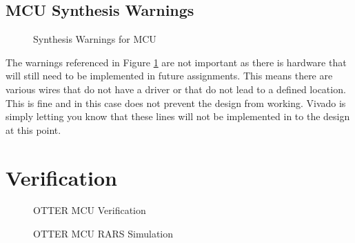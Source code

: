 \documentclass[
    a4paper, %
	12pt, %
    ]{CSSullivanBusinessReport}
\begin{document}
\begin{fullwidth}
\subsection{MCU Synthesis Warnings} %
\begin{figure}[H]
    \captionsetup{style=widetable}
    \caption{Synthesis Warnings for MCU}
    \label{fig:MCUWarnings}
\end{figure}

The warnings referenced in Figure \ref{fig:MCUWarnings} are not important as there is hardware that will still need to be implemented in future assignments. This means there are various wires that do not have a driver or that do not lead to a defined location. This is fine and in this case does not prevent the design from working. Vivado is simply letting you know that these lines will not be implemented in to the design at this point.

\section{Verification} %

\begin{figure}[H]
    \captionsetup{style=widetable}
    \caption{OTTER MCU Verification}
    \label{fig:otterVerification}
\end{figure}

\begin{figure}[H]
    \captionsetup{style=widetable}
    \caption{OTTER MCU RARS Simulation}
    \label{fig:rarsVerification}
\end{figure}


\end{fullwidth}
\end{document}
